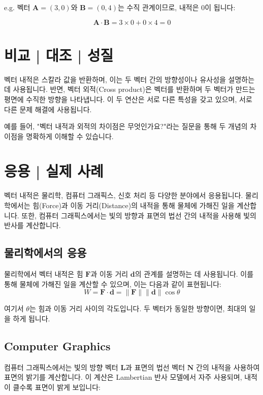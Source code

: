 \documentclass[12pt]{article}
\begin{document}
\vspace{1\baselineskip}
\noindent {} e.g. 벡터 \( \mathbf{A} = (3, 0) \)와 \( \mathbf{B} = (0, 4) \)는 수직 관계이므로, 내적은 0이 됩니다:

\[
  \mathbf{A} \cdot \mathbf{B} = 3 \times 0 + 0 \times 4 = 0
\]

\section{비교 | 대조 | 성질}

\noindent 벡터 내적은 스칼라 값을 반환하며, 이는 두 벡터 간의 방향성이나 유사성을 설명하는 데 사용됩니다. 반면, 벡터 외적(Cross product)은 벡터를 반환하며 두 벡터가 만드는 평면에 수직한 방향을 나타냅니다. 이 두 연산은 서로 다른 특성을 갖고 있으며, 서로 다른 문제 해결에 사용됩니다.

\noindent 예를 들어, "벡터 내적과 외적의 차이점은 무엇인가요?"라는 질문을 통해 두 개념의 차이점을 명확하게 이해할 수 있습니다.

\section{응용 | 실제 사례}

\noindent 벡터 내적은 물리학, 컴퓨터 그래픽스, 신호 처리 등 다양한 분야에서 응용됩니다. 물리학에서는 힘(Force)과 이동 거리(Distance)의 내적을 통해 물체에 가해진 일을 계산합니다. 또한, 컴퓨터 그래픽스에서는 빛의 방향과 표면의 법선 간의 내적을 사용해 빛의 반사를 계산합니다.

\subsection{물리학에서의 응용}

\noindent 물리학에서 벡터 내적은 힘 \( \mathbf{F} \)과 이동 거리 \( \mathbf{d} \)의 관계를 설명하는 데 사용됩니다. 이를 통해 물체에 가해진 일을 계산할 수 있으며, 이는 다음과 같이 표현됩니다:
\[
  W = \mathbf{F} \cdot \mathbf{d} = \| \mathbf{F} \| \| \mathbf{d} \| \cos{\theta}
\]

\noindent 여기서 \( \theta \)는 힘과 이동 거리 사이의 각도입니다. 두 벡터가 동일한 방향이면, 최대의 일을 하게 됩니다.

\subsection{Computer Graphics}

\noindent 컴퓨터 그래픽스에서는 빛의 방향 벡터 \( \mathbf{L} \)과 표면의 법선 벡터 \( \mathbf{N} \) 간의 내적을 사용하여 표면의 밝기를 계산합니다. 이 계산은 Lambertian 반사 모델에서 자주 사용되며, 내적이 클수록 표면이 밝게 보입니다:
\end{document}
